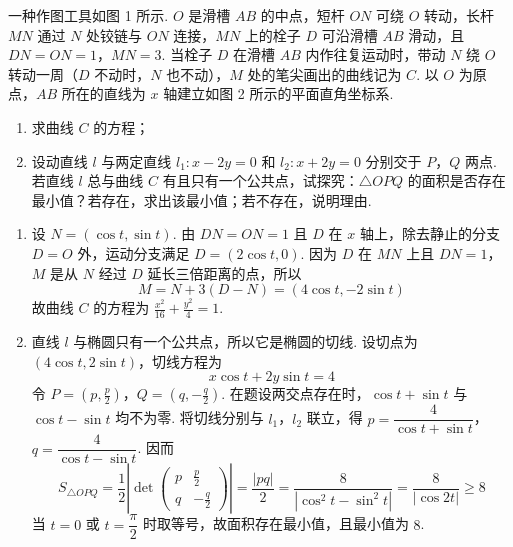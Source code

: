 \begin{problem}
一种作图工具如图 1 所示. \(O\) 是滑槽 \(AB\) 的中点，短杆 \(ON\) 可绕 \(O\) 转动，长杆 \(MN\) 通过 \(N\) 处铰链与 \(ON\) 连接，\(MN\) 上的栓子 \(D\) 可沿滑槽 \(AB\) 滑动，且 \(DN=ON=1\)，\(MN=3\). 当栓子 \(D\) 在滑槽 \(AB\) 内作往复运动时，带动 \(N\) 绕 \(O\) 转动一周（\(D\) 不动时，\(N\) 也不动），\(M\) 处的笔尖画出的曲线记为 \(C\). 以 \(O\) 为原点，\(AB\) 所在的直线为 \(x\) 轴建立如图 2 所示的平面直角坐标系.

\begin{enumerate}
\item 求曲线 \(C\) 的方程；
\item 设动直线 \(l\) 与两定直线 \(l_1\colon x-2y=0\) 和 \(l_2\colon x+2y=0\) 分别交于 \(P\)，\(Q\) 两点. 若直线 \(l\) 总与曲线 \(C\) 有且只有一个公共点，试探究：\(\triangle OPQ\) 的面积是否存在最小值？若存在，求出该最小值；若不存在，说明理由.
\end{enumerate}

\end{problem}

\begin{solution}
\begin{enumerate}
\item 设 \(N=(\cos t,\sin t)\). 由 \(DN=ON=1\) 且 \(D\) 在 \(x\) 轴上，除去静止的分支 \(D=O\) 外，运动分支满足 \(D=(2\cos t,0)\). 因为 \(D\) 在 \(MN\) 上且 \(DN=1\)，\(M\) 是从 \(N\) 经过 \(D\) 延长三倍距离的点，所以
\[
M= N+3(D-N)=(4\cos t,-2\sin t)
\]
故曲线 \(C\) 的方程为 \(\displaystyle\frac{x^2}{16}+\frac{y^2}{4}=1\).

\item 直线 \(l\) 与椭圆只有一个公共点，所以它是椭圆的切线. 设切点为 \((4\cos t,2\sin t)\)，切线方程为
\[
x\cos t+2y\sin t=4
\]
令 \(P=(p,\frac p2)\)，\(Q=(q,-\frac q2)\). 在题设两交点存在时，\(\cos t+\sin t\) 与 \(\cos t-\sin t\) 均不为零. 将切线分别与 \(l_1\)，\(l_2\) 联立，得
\(p=\dfrac4{\cos t+\sin t}\)，\(q=\dfrac4{\cos t-\sin t}\). 因而
\[
S_{\triangle OPQ}=\frac12\left|\det\begin{pmatrix}p&\frac{p}{2}\\q&-\frac{q}{2}\end{pmatrix}\right|
=\frac{|pq|}{2}
=\frac8{|\cos^2t-\sin^2t|}
=\frac8{|\cos2t|}\geqslant8
\]
当 \(t=0\) 或 \(t=\dfrac\pi2\) 时取等号，故面积存在最小值，且最小值为 \(8\).
\end{enumerate}
\end{solution}

